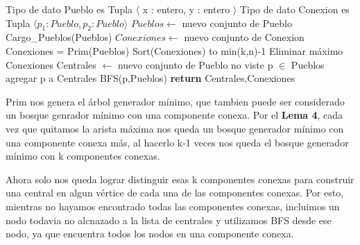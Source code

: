 \begin{pseudo}
\State Tipo de dato Pueblo es Tupla $\langle$ x : entero, y : entero $\rangle$
\State Tipo de dato Conexion es Tupla $\langle p_1 : Pueblo, p_2 : Pueblo \rangle$
        \State $Pueblos \leftarrow$ nuevo conjunto de Pueblo 
        \State Cargo\_Pueblos(Pueblos) 
        \State $Conexiones \leftarrow$ nuevo conjunto de Conexion 
        \State Conexiones = Prim(Pueblos) 
        \State Sort(Conexiones) 
         to min(k,n)-1 
	  \State Eliminar máximo Conexiones 
	\EndFor
        \State Centrales $\leftarrow$ nuevo conjunto de Pueblo 
        \While no viste p $\in$ Pueblos
        \State agregar p a Centrales
        \State BFS(p,Pueblos)
        \EndWhile
        \State \textbf{return} Centrales,Conexiones 
    \EndProcedure
\end{pseudo}

Prim nos genera el árbol generador mínimo, que tambien puede ser considerado un bosque genrador mínimo con una componente conexa. Por el \textbf{Lema 4}, cada vez que quitamos la arista máxima nos queda un bosque generador mínimo con una componente conexa más, al hacerlo k-1 veces nos queda el bosque generador mínimo con k componentes conexas.

Ahora solo nos queda lograr distinguir esas k componentes conexas para construir una central en algun vértice de cada una de las componentes conexas. Por esto, mientras no hayamos encontrado todas las componentes conexas, incluimos un nodo todavia no alcnazado a la lista de centrales y utilizamos BFS desde ese nodo, ya que encuentra todos los nodos en una componente conexa.